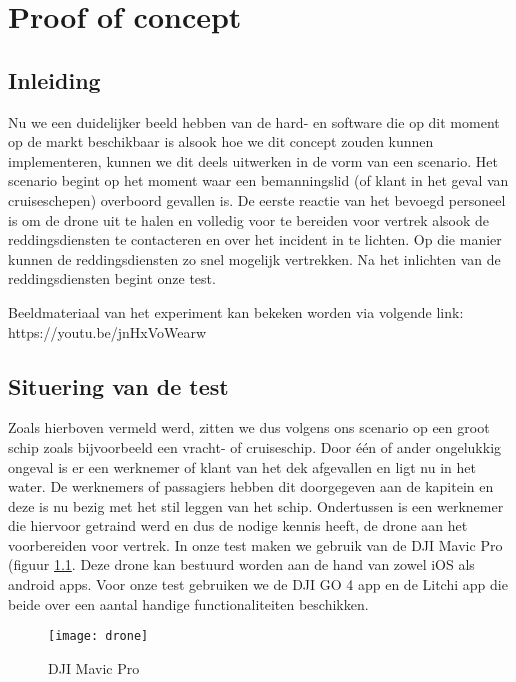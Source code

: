 \chapter{Proof of concept}
\label{ch:proofofconcept}

\section{Inleiding}

Nu we een duidelijker beeld hebben van de hard- en software die op dit moment op de markt beschikbaar is alsook hoe we dit concept zouden kunnen implementeren, kunnen we dit deels uitwerken in de vorm van een scenario.
Het scenario begint op het moment waar een bemanningslid (of klant in het geval van cruiseschepen) overboord gevallen is. De eerste reactie van het bevoegd personeel is om de drone uit te halen en volledig voor te bereiden voor vertrek alsook de reddingsdiensten te contacteren en over het incident in te lichten. Op die manier kunnen de reddingsdiensten zo snel mogelijk vertrekken.
Na het inlichten van de reddingsdiensten begint onze test. 

Beeldmateriaal van het experiment kan bekeken worden via volgende link:\newline
https://youtu.be/jnHxVoWearw

\section{Situering van de test}

Zoals hierboven vermeld werd, zitten we dus volgens ons scenario op een groot schip zoals bijvoorbeeld een vracht- of cruiseschip. Door één of ander ongelukkig ongeval is er een werknemer of klant van het dek afgevallen en ligt nu in het water. De werknemers of passagiers hebben dit doorgegeven aan de kapitein en deze is nu bezig met het stil leggen van het schip. Ondertussen is een werknemer die hiervoor getraind werd en dus de nodige kennis heeft, de drone aan het voorbereiden voor vertrek. In onze test maken we gebruik van de DJI Mavic Pro (figuur \ref{drone}. Deze drone kan bestuurd worden aan de hand van zowel iOS als android apps. Voor onze test gebruiken we de DJI GO 4 app en de Litchi app die beide over een aantal handige functionaliteiten beschikken.

\begin{figure}[h]
	\centering
	\texttt{[image: drone]}
	\caption{DJI Mavic Pro \autocite{MavicProImage}}
	\label{drone}
\end{figure}

